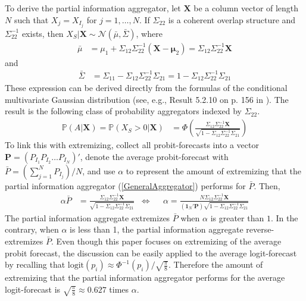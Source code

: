 \documentclass[11pt]{article}
\renewcommand{\P}{\mathbb{P}}
\theoremstyle{definition}
\theoremstyle{definition}
\begin{document}
To derive the partial information aggregator, let $\boldsymbol{X}$ be a column vector of length $N$ such that $X_j = X_{I_j}$ for $j = 1, \dots, N$. If $\Sigma_{22}$ is a coherent overlap structure and $\Sigma_{22}^{-1}$ exists, then $X_{S} | \boldsymbol{X} \sim \mathcal{N}(\bar{\mu}, \bar{\Sigma})$, where
\begin{align}
\bar{\mu} &= \mu_1 + \Sigma_{12} \Sigma_{22}^{-1} (\boldsymbol{X} - \boldsymbol{\mu}_2) =  \Sigma_{12} \Sigma_{22}^{-1} \boldsymbol{X} \label{condMu}
\end{align}
and
\begin{align}
 \bar{\Sigma}&= \Sigma_{11} - \Sigma_{12} \Sigma_{22}^{-1} \Sigma_{21} =1 - \Sigma_{12} \Sigma_{22}^{-1} \Sigma_{21}  \label{condSigma}
\end{align}
These expression can be derived directly from the formulas of the conditional multivariate Gaussian distribution (see, e.g., Result 5.2.10 on p. 156 in \cite{ravishanker2001first}). The result is the following class of probability aggregators indexed by $\Sigma_{22}$.
\begin{align}
\P\left(A  | \boldsymbol{X}\right)  = \P\left(X_{S} > 0 | \boldsymbol{X}\right) &= \Phi\left( \frac{\Sigma_{12} \Sigma_{22}^{-1} \boldsymbol{X}}{\sqrt{1 - \Sigma_{12} \Sigma_{22}^{-1} \Sigma_{21}}}\right) \label{GeneralAggregator}
\end{align}
To link this with extremizing, collect all probit-forecasts into a vector $\boldsymbol{P} = (P_{I_1} P_{I_2} \dots P_{I_N})'$, denote the average probit-forecast with $\bar{P} = \left( \sum_{j=1}^N P_{I_j} \right)/N$, and use $\alpha$ to represent the amount of extremizing that the partial information aggregator (\ref{GeneralAggregator}) performs for $\bar{P}$. Then,
\begin{align}
\alpha \bar{P}&=  \frac{\Sigma_{12} \Sigma_{22}^{-1} \boldsymbol{X}}{\sqrt{1 - \Sigma_{12} \Sigma_{22}^{-1} \Sigma_{21}}}  &\Leftrightarrow&& \alpha  = \frac{N \Sigma_{12} \Sigma_{22}^{-1} \boldsymbol{X}}{\left(\boldsymbol{1}_N' \boldsymbol{P} \right) \sqrt{1 - \Sigma_{12} \Sigma_{22}^{-1} \Sigma_{21}}} \label{alpha}
\end{align}
The partial information aggregate extremizes $\bar{P}$ when $\alpha$ is greater than $1$. In the contrary, when $\alpha$ is less than 1, the partial information aggregate reverse-extremizes $\bar{P}$. Even though this paper focuses on extremizing of the average probit forecast, the discussion can be easily applied to the average logit-forecast by recalling that $\text{logit}(p_i) \approx \Phi^{-1}(p_i)/\sqrt{\frac{\pi}{8}}$. Therefore the amount of extremizing that the partial information aggregator performs for the average logit-forecast is $\sqrt{\frac{\pi}{8}} \approx 0.627$ times $\alpha$.  
\end{document}
